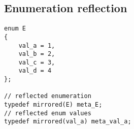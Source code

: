 \subsection{Enumeration reflection}

\begin{verbatim}
enum E
{
	val_a = 1,
	val_b = 2,
	val_c = 3,
	val_d = 4
};

// reflected enumeration
typedef mirrored(E) meta_E;
// reflected enum values
typedef mirrored(val_a) meta_val_a;
\end{verbatim}
